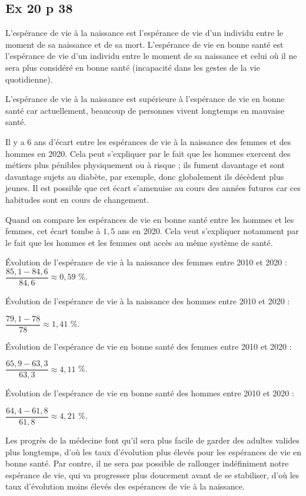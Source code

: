 \documentclass[12pt,a4paper]{book}
\begin{document}
\subsection*{Ex 20 p 38}


\begin{enumMet}
	\item 
	\begin{enumMet}
		\item L'espérance de vie à la naissance est l'espérance de vie d'un individu entre le moment de sa naissance et de sa mort. L'espérance de vie en bonne santé est l'espérance de vie d'un individu entre le moment de sa naissance et celui où il ne sera plus considéré en bonne santé (incapacité dans les gestes de la vie quotidienne).
		\item L'espérance de vie à la naissance est supérieure à l'espérance de vie en bonne santé car actuellement, beaucoup de personnes vivent longtemps en mauvaise santé.
	\end{enumMet}
	\item Il y a 6 ans d'écart entre les espérances de vie à la naissance des femmes et des         hommes en 2020. Cela peut s'expliquer par le fait que les hommes exercent des métiers plus pénibles physiquement ou à risque ; ils fument davantage et sont davantage sujets au diabète, par exemple, donc globalement ils décèdent plus jeunes. Il est possible que cet écart s'amenuise au cours des années futures car ces habitudes sont en cours de changement.
	\item Quand on compare les espérances de vie en bonne santé entre les hommes et les femmes, cet écart tombe à $1,5$ ans en 2020. Cela veut s'expliquer notamment par le fait que les hommes et les femmes ont accès au même système de santé.
	\item 
	\begin{enumMet}
		\item Évolution de l'espérance de vie à la naissance des femmes entre 2010 et 2020 :\\
		$\dfrac{85,1-84,6}{84,6} \approx 0,59$ \%.
		
		Évolution de l'espérance de vie à la naissance des hommes entre 2010 et 2020 :
		
		$\dfrac{79,1-78}{78} \approx 1,41$ \%.
		\item Évolution de l'espérance de vie en bonne santé des femmes entre 2010 et 2020 : 
		
		$\dfrac{65,9-63,3}{63,3} \approx 4,11$ \%.
		
		Évolution de l'espérance de vie en bonne santé des hommes entre 2010 et 2020 : 
		
		$\dfrac{64,4-61,8}{61,8} \approx 4,21$ \%.
		\item Les progrès de la médecine font qu'il sera plus facile de garder des adultes valides plus longtemps, d'où les taux d'évolution plus élevés pour les espérances de vie en bonne santé. Par contre, il ne sera pas possible de rallonger indéfiniment notre espérance de vie, qui va progresser plus doucement avant de se stabiliser, d'où les taux d'évolution moins élevés des espérances de vie à la naissance.
	\end{enumMet}
\end{enumMet}
\end{document}
